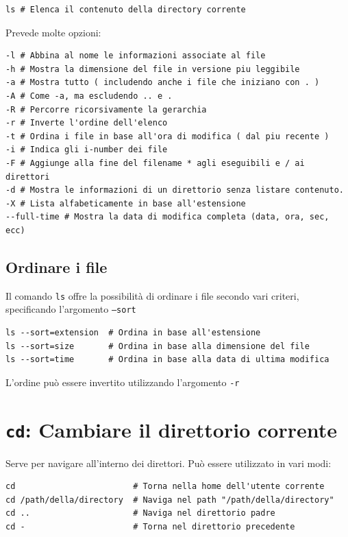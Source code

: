 \documentclass[a4paper]{report}
\newenvironment{code}{\begin{tcolorbox}[size=small]}{\end{tcolorbox}}
\begin{document}
\begin{code}
\begin{lstlisting}
ls # Elenca il contenuto della directory corrente
\end{lstlisting}

Prevede molte opzioni:

\begin{lstlisting}
-l # Abbina al nome le informazioni associate al file
-h # Mostra la dimensione del file in versione piu leggibile
-a # Mostra tutto ( includendo anche i file che iniziano con . )
-A # Come -a, ma escludendo .. e .
-R # Percorre ricorsivamente la gerarchia
-r # Inverte l'ordine dell'elenco
-t # Ordina i file in base all'ora di modifica ( dal piu recente )
-i # Indica gli i-number dei file
-F # Aggiunge alla fine del filename * agli eseguibili e / ai direttori
-d # Mostra le informazioni di un direttorio senza listare contenuto.
-X # Lista alfabeticamente in base all'estensione
--full-time # Mostra la data di modifica completa (data, ora, sec, ecc)
\end{lstlisting}
\end{code}

\subsection*{Ordinare i file}
Il comando \texttt{ls} offre la possibilità di ordinare i file secondo vari criteri, specificando l'argomento \texttt{--sort}

\begin{code}
\begin{lstlisting}
ls --sort=extension  # Ordina in base all'estensione
ls --sort=size       # Ordina in base alla dimensione del file
ls --sort=time       # Ordina in base alla data di ultima modifica
\end{lstlisting}

L'ordine può essere invertito utilizzando l'argomento \texttt{-r}
\end{code}

\section{\texttt{cd}: Cambiare il direttorio corrente}

Serve per navigare all'interno dei direttori. Può essere utilizzato in vari modi:

\begin{code}
\begin{lstlisting}
cd                        # Torna nella home dell'utente corrente
cd /path/della/directory  # Naviga nel path "/path/della/directory"
cd ..                     # Naviga nel direttorio padre
cd -                      # Torna nel direttorio precedente
\end{lstlisting}
\end{code}
\end{document}
